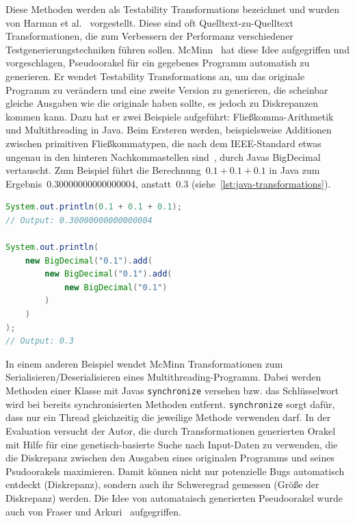 \documentclass{article}
\begin{document}
Diese Methoden werden als Testability Transformations bezeichnet und wurden von Harman et al.~\cite{Harman2004} vorgestellt. Diese sind oft Quelltext-zu-Quelltext Transformationen, die zum Verbessern der Performanz verschiedener Testgenerierungstechniken führen sollen. McMinn~\cite{McMinn2009} hat diese Idee aufgegriffen und vorgeschlagen, Pseudoorakel für ein gegebenes Programm automatish zu generieren. Er wendet Testability Transformations an, um das originale Programm zu verändern und eine zweite Version zu generieren, die scheinbar gleiche Ausgaben wie die originale haben sollte, es jedoch zu Diskrepanzen kommen kann. Dazu hat er zwei Beispiele aufgeführt: Fließkomma-Arithmetik und Multithreading in Java. Beim Ersteren werden, beispielsweise Additionen zwischen primitiven Fließkommatypen, die nach dem IEEE-Standard etwas ungenau in den hinteren Nachkommastellen sind~\cite{10.1145/103162.103163}, durch Javas BigDecimal vertauscht. Zum Beispiel führt die Berechnung~$0.1 + 0.1 + 0.1$ in Java zum Ergebnis~$0.30000000000000004$, anstatt~$0.3$ (siehe~\cref{lst:java-transformations}).

\begin{lstlisting}[language=Java, style=boxed, caption={Comparing floating-point arithmetic in Java using double compared to \lstinline{BigDecimal}~\cite{McMinn2009}}, label=lst:java-transformations]
System.out.println(0.1 + 0.1 + 0.1);
// Output: 0.30000000000000004

System.out.println(
    new BigDecimal("0.1").add(
        new BigDecimal("0.1").add(
            new BigDecimal("0.1")
        )
    )
);
// Output: 0.3
\end{lstlisting}

In einem anderen Beispiel wendet McMinn Transformationen zum Serialisieren/Deserialisieren eines Multithreading-Programm. Dabei werden Methoden einer Klasse mit Javas \lstinline{synchronize} versehen bzw. das Schlüsselwort wird bei bereits synchronisierten Methoden entfernt. \lstinline{synchronize} sorgt dafür, dass nur ein Thread gleichzeitig die jeweilige Methode verwenden darf. In der Evaluation versucht der Autor, die durch Transformationen generierten Orakel mit Hilfe für eine genetisch-basierte Suche nach Input-Daten zu verwenden, die die Diskrepanz zwischen den Ausgaben eines originalen Programms und seines Psudoorakels maximieren. Damit können nicht nur potenzielle Bugs automatisch entdeckt (Diskrepanz), sondern auch ihr Schweregrad gemessen (Größe der Diskrepanz) werden. Die Idee von automataisch generierten Pseudoorakel wurde auch von Fraser und Arkuri~\cite{Fraser_2013} aufgegriffen. 
\end{document}
